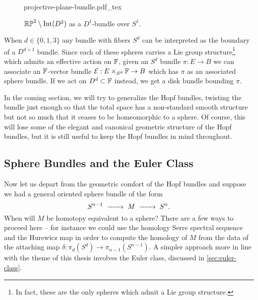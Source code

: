 \begin{figure}[ht]
	\centering
	{projective-plane-bundle.pdf_tex}
	\caption{$\mathbb{RP}^2\setminus \operatorname{Int}(D^2)$ as a $D^1$-bundle over $S^1$.}\label{fig:mobius-bundle-and-hopf-bundle}
\end{figure}

\begin{remark}\label{rmk:lie-group-structure-Sd}
	When $d\in \{0,1,3\}$ any bundle with fibers $S^d$ can be interpreted as the boundary of a $D^{d+1}$ bundle. Since each of these spheres carries a Lie group structure\footnote{In fact, these are the only spheres which admit a Lie group structure.} which admits an effective action on $\mathbb{F}$, given an $S^d$ bundle $\pi : E \to B$ we can associate an $\mathbb{F}$-vector bundle $\mathcal{E} : E\times_{S^d} \mathbb{F} \to B$ which has $\pi$ as an associated sphere bundle. If we act on $D^d\subset \mathbb{F}$ instead, we get a disk bundle bounding $\pi$.
\end{remark}

In the coming section, we will try to generalize the Hopf bundles, twisting the bundle just enough so that the total space has a non-standard smooth structure but not so much that it ceases to be homeomorphic to a sphere.
Of course, this will lose some of the elegant and canonical geometric structure of the Hopf bundles, but it is still useful to keep the Hopf bundles in mind throughout.

\subsection{Sphere Bundles and the Euler Class}

Now let us depart from the geometric comfort of the Hopf bundles and suppose we had a general oriented sphere bundle of the form
\begin{equation}\label{eq:general-spherical-fibration}
	S^{n-1}\lkxto M \lkxto S^n.
\end{equation}
When will $M$ be homotopy equivalent to a sphere? There are a few ways to proceed here -- for instance we could use the homology Serre spectral sequence and the Hurewicz map in order to compute the homology of $M$ from the data of the attaching map $\delta : \pi_d(S^d) \to \pi_{n-1}(S^{n-1})$. 
A simpler approach more in line with the theme of this thesis involves the Euler class, discussed in \cref{sec:euler-class}.

